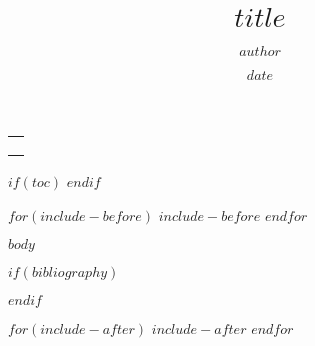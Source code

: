 \documentclass[
$if(fontsize)$
$fontsize$,
$endif$
$if(lang)$
$babel-lang$,
$endif$
$for(classoption)$
$classoption$$sep$,
$endfor$
a4paper]{article}
\title{$title$}
\author{$author$}
\date{$date$}
\makeatletter
\newcommand\BackgroundPic{%
	\put(0,0){%
		\parbox[b][\paperheight]{\paperwidth}{%
			\vfill
			\centering
			\texttt{[image: \\cover]}%
			\vfill
}}}
\renewcommand{\maketitle}{
	\thispagestyle{customtitle}
	\AddToShipoutPicture*{\BackgroundPic}
	\ClearShipoutPicture

	\phantom{a}\hfill
	\vspace{13cm}

	\begin{tabular}[l]{@{}p{\textwidth}@{}}
		\color{mydarkblue}\headingfont\Huge\@title\\[1em]
		\color{mydarkblue}\headingfont\LARGE\@author\\[1em]
		\color{mydarkblue}\headingfont\large\@date\\[1em]
	\end{tabular}


	\clearpage
}
\renewcommand{\maketitle}{
	\thispagestyle{customtitle}
	\phantom{a}\hfill
	\vspace{13cm}

	\begin{tabular}[l]{@{}p{\textwidth}@{}}
		\color{mydarkblue}\headingfont\Huge\@title\\[1em]
		\color{mydarkblue}\headingfont\LARGE\@author\\[1em]
		\color{mydarkblue}\headingfont\large\@date\\[1em]
	\end{tabular}


	\clearpage
}
\makeatother
\begin{document}
\maketitle

$if(toc)$
\tableofcontents
\clearpage
$endif$

$for(include-before)$
  $include-before$
$endfor$

$body$

\clearpage

$if(bibliography)$
  
  
$endif$


$for(include-after)$
  $include-after$
$endfor$
\end{document}
